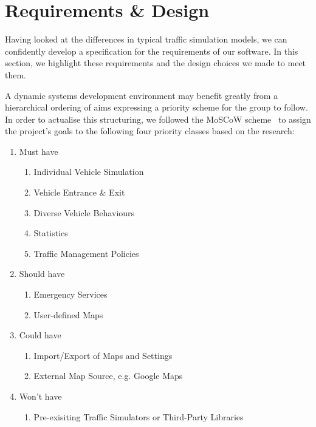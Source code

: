 \section{Requirements \& Design}\label{sec:reqs}
Having looked at the differences in typical traffic simulation models, we can confidently develop a specification for the requirements of our software. In this section, we highlight these requirements and the design choices we made to meet them.

A dynamic systems development environment may benefit greatly from a hierarchical ordering of aims expressing a priority scheme for the group to follow. In order to actualise this structuring, we followed the MoSCoW scheme~\cite{brennan2009} to assign the project's goals to the following four priority classes based on the research:
\begin{enumerate} \itemsep1pt \parskip0pt 
	\item{Must have}
		\begin{enumerate} \itemsep1pt \parskip0pt 
			\item{Individual Vehicle Simulation}
			\item{Vehicle Entrance \& Exit}
			\item{Diverse Vehicle Behaviours}
			\item{Statistics}
			\item{Traffic Management Policies}
		\end{enumerate}
	\item{Should have}
		\begin{enumerate} \itemsep1pt \parskip0pt 
			\item{Emergency Services}
			\item{User-defined Maps}
		\end{enumerate}
	\item{Could have}
		\begin{enumerate} \itemsep1pt \parskip0pt 
			\item{Import/Export of Maps and Settings}
			\item{External Map Source, e.g. Google Maps}
		\end{enumerate}
	\item{Won't have}
		\begin{enumerate} \itemsep1pt \parskip0pt 
			\item{Pre-exisiting Traffic Simulators or Third-Party Libraries}
		\end{enumerate}
\end{enumerate}

